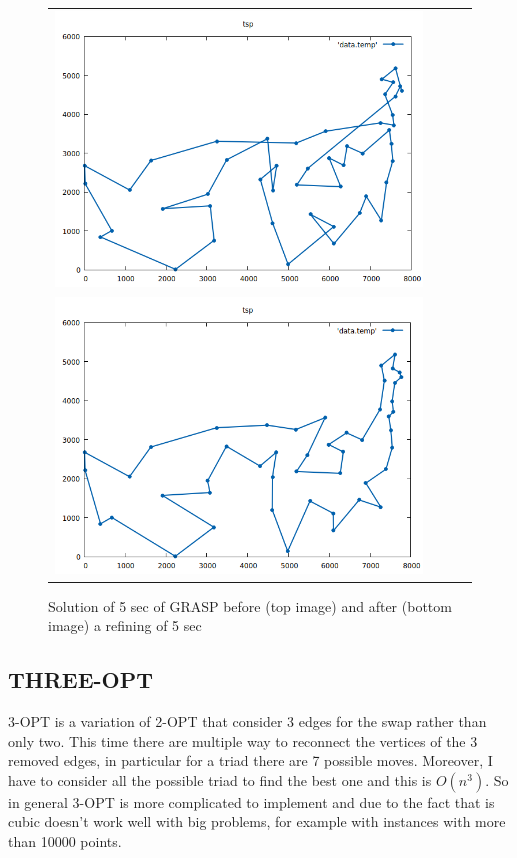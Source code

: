 \begin{figure}[h!]
\centering
	\begin{tabular}{@{}cccc@{}}
		\includegraphics[scale=0.40]{media/before2opt.png} \\
		\includegraphics[scale=0.40]{media/after2opt.png} \\
	\end{tabular}
	\caption{Solution of 5 sec of GRASP before (top image) and after (bottom image) a refining of 5 sec}
\end{figure}


\subsection{THREE-OPT}
3-OPT is a variation of 2-OPT that consider 3 edges for the swap rather than only two. This time there are multiple way to reconnect the vertices of the 3 removed edges, in particular for a triad there are 7 possible moves. Moreover, I have to consider all the possible triad to find the best one and this is $O(n^3)$. So in general 3-OPT is more complicated to implement and due to the fact that is cubic doesn't work well with big problems, for example with instances with more than 10000 points.

